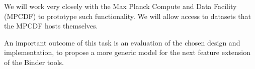 \begin{task}
  We will work very closely with the Max Planck Compute and Data Facility
  (MPCDF) to prototype such functionality. We will allow access to datasets
  that the MPCDF hosts themselves.

  An important outcome of this task is an evaluation of the chosen design and
  implementation, to propose a more generic model for the next feature extension
  of the Binder tools.
\end{task}
